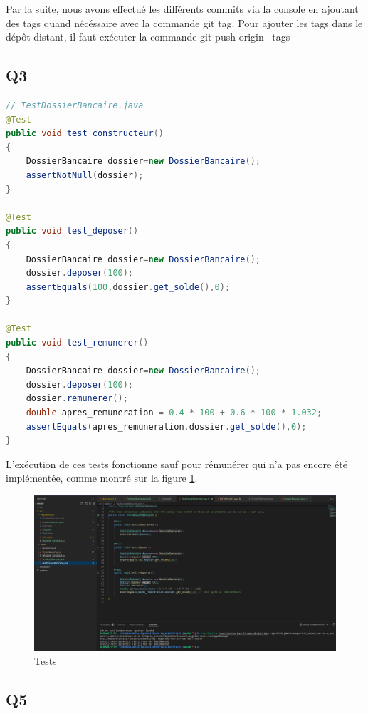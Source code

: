 \documentclass[12pt]{article}
\begin{document}
Par la suite, nous avons effectué les différents commits via la console en ajoutant des tags quand 
nécéssaire avec la commande \textquotesingle git tag\textquotesingle .
Pour ajouter les tags dans le dépôt distant, il faut exécuter la commande \textquotesingle git push origin --tags\textquotesingle

\subsection{Q3}

\begin{lstlisting}[language=Java]
// TestDossierBancaire.java
@Test
public void test_constructeur() 
{
	DossierBancaire dossier=new DossierBancaire();
	assertNotNull(dossier);
}

@Test  
public void test_deposer() 
{
	DossierBancaire dossier=new DossierBancaire();
	dossier.deposer(100);
	assertEquals(100,dossier.get_solde(),0); 
}

@Test
public void test_remunerer() 
{
	DossierBancaire dossier=new DossierBancaire();
	dossier.deposer(100);
	dossier.remunerer();
	double apres_remuneration = 0.4 * 100 + 0.6 * 100 * 1.032;
	assertEquals(apres_remuneration,dossier.get_solde(),0);
}
\end{lstlisting}

L'exécution de ces tests fonctionne sauf pour rémunérer qui n'a pas encore été implémentée, comme montré sur la figure \ref{ScreenE3Q31}.
\begin{figure}[h]
    \centering
    \includegraphics[width=\textwidth]{img/Screenshots/E3_Q3_1.png}
    \caption{Tests\label{ScreenE3Q31}}
\end{figure}

\subsection{Q5}
\end{document}
